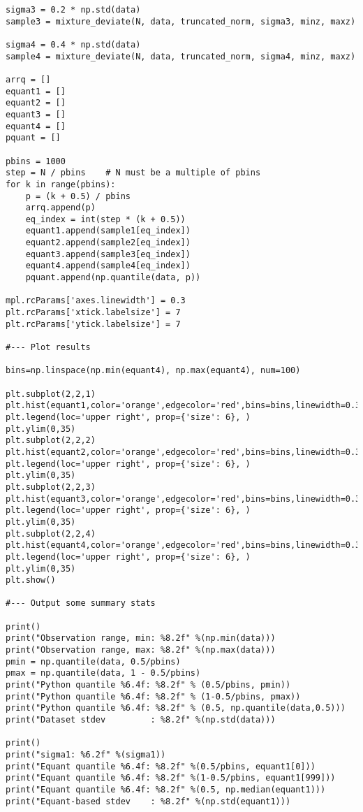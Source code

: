 \documentclass[oneside,10pt]{book}
\begin{document}
\begin{lstlisting}
sigma3 = 0.2 * np.std(data) 
sample3 = mixture_deviate(N, data, truncated_norm, sigma3, minz, maxz)

sigma4 = 0.4 * np.std(data) 
sample4 = mixture_deviate(N, data, truncated_norm, sigma4, minz, maxz)

arrq = []
equant1 = []
equant2 = []
equant3 = []
equant4 = []
pquant = []

pbins = 1000
step = N / pbins    # N must be a multiple of pbins
for k in range(pbins):
    p = (k + 0.5) / pbins
    arrq.append(p)
    eq_index = int(step * (k + 0.5))
    equant1.append(sample1[eq_index])
    equant2.append(sample2[eq_index])
    equant3.append(sample3[eq_index])
    equant4.append(sample4[eq_index])
    pquant.append(np.quantile(data, p))

mpl.rcParams['axes.linewidth'] = 0.3
plt.rcParams['xtick.labelsize'] = 7
plt.rcParams['ytick.labelsize'] = 7

#--- Plot results

bins=np.linspace(np.min(equant4), np.max(equant4), num=100)

plt.subplot(2,2,1)
plt.hist(equant1,color='orange',edgecolor='red',bins=bins,linewidth=0.3,label='v=0.0')
plt.legend(loc='upper right', prop={'size': 6}, )
plt.ylim(0,35)
plt.subplot(2,2,2)
plt.hist(equant2,color='orange',edgecolor='red',bins=bins,linewidth=0.3,label='v=0.1')
plt.legend(loc='upper right', prop={'size': 6}, )
plt.ylim(0,35)
plt.subplot(2,2,3)
plt.hist(equant3,color='orange',edgecolor='red',bins=bins,linewidth=0.3,label='v=0.2')
plt.legend(loc='upper right', prop={'size': 6}, )
plt.ylim(0,35)
plt.subplot(2,2,4)
plt.hist(equant4,color='orange',edgecolor='red',bins=bins,linewidth=0.3,label='v=0.4')
plt.legend(loc='upper right', prop={'size': 6}, )
plt.ylim(0,35)
plt.show()

#--- Output some summary stats

print()
print("Observation range, min: %8.2f" %(np.min(data)))
print("Observation range, max: %8.2f" %(np.max(data)))
pmin = np.quantile(data, 0.5/pbins)
pmax = np.quantile(data, 1 - 0.5/pbins)
print("Python quantile %6.4f: %8.2f" % (0.5/pbins, pmin))
print("Python quantile %6.4f: %8.2f" % (1-0.5/pbins, pmax))
print("Python quantile %6.4f: %8.2f" % (0.5, np.quantile(data,0.5)))
print("Dataset stdev         : %8.2f" %(np.std(data)))

print()
print("sigma1: %6.2f" %(sigma1))
print("Equant quantile %6.4f: %8.2f" %(0.5/pbins, equant1[0]))
print("Equant quantile %6.4f: %8.2f" %(1-0.5/pbins, equant1[999]))
print("Equant quantile %6.4f: %8.2f" %(0.5, np.median(equant1)))
print("Equant-based stdev    : %8.2f" %(np.std(equant1)))


\end{lstlisting}
\end{document}
